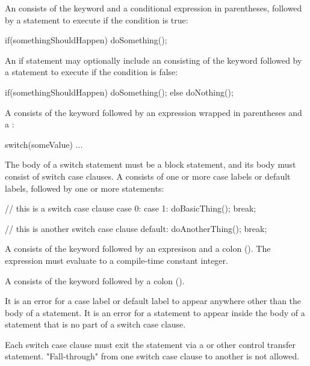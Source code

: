 An  consists of the  keyword and a conditional expression in parentheses, followed by a statement to execute if the condition is true:

\begin{codeblock}
if(somethingShouldHappen)
    doSomething();
\end{codeblock}

An if statement may optionally include an  consisting of the keyword  followed by a statement to execute if the condition is false:

\begin{codeblock}
if(somethingShouldHappen)
 	doSomething();
else
	doNothing();
\end{codeblock}


A  consists of the  keyword followed by an expression wrapped in parentheses and a :

\begin{codeblock}
switch(someValue)
{
	...
}
\end{codeblock}

The body of a switch statement must be a block statement, and its body must consist of switch case clauses.
A  consists of one or more case labels or default labels, followed by one or more statements:

\begin{codeblock}
// this is a switch case clause
case 0:
case 1:
    doBasicThing();
    break;

// this is another switch case clause
default:
    doAnotherThing();
    break;
\end{codeblock}

A  consists of the keyword  followed by an expresison and a colon (\Char{:}).
The expression must evaluate to a compile-time constant integer.

A  consists of the keyword  followed by a colon (\Char{:}).

It is an error for a case label or default label to appear anywhere other than the body of a  statement.
It is an error for a statement to appear inside the body of a  statement that is no part of a switch case clause.

Each switch case clause must exit the  statement via a  or other control transfer statement.
"Fall-through" from one switch case clause to another is not allowed.

